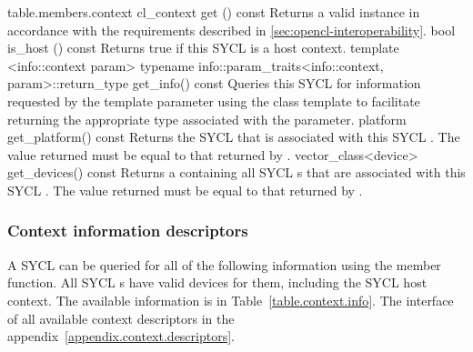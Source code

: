{table.members.context}
  \addRow
    {cl_context get () const}
    { 
      Returns a valid  instance in accordance with the requirements described in \ref{sec:opencl-interoperability}.  
    }
  \addRow
    {bool is_host () const}
    {
      Returns true if this SYCL  is a host context.
    }
  \addRowTwoL
    {template <info::context param> typename info::param_traits<info::context, param>::return_type}
    {  get_info() const}
    {
      Queries this SYCL  for information requested by the template parameter  using the  class template to facilitate returning the appropriate type associated with the  parameter.
    }
  \addRow
    {platform get_platform() const}
    {
      Returns the SYCL  that is associated with this SYCL . The value returned must be equal to that returned by .
    }
  \addRowTwoL
    {vector_class<device>}
    {get_devices() const}
    {
      Returns a  containing all SYCL s that are associated with this SYCL . The value returned must be equal to that returned by .
    }
\completeTable


\subsubsection{Context information descriptors}

A SYCL  can be queried for all of the following information using the
 member function. All SYCL s have valid devices for them, including the SYCL host context. The available information is in Table~\ref{table.context.info}. The interface of all available context descriptors in the appendix~\ref{appendix.context.descriptors}.


